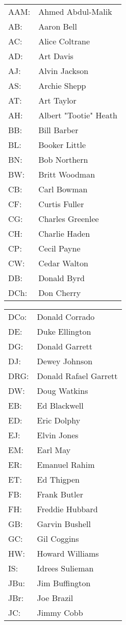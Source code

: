 \documentclass[a4paper,landscape]{article}
\begin{document}
{\tiny
\newcommand{\split}{\end{tabular}\begin{tabular}{l@{~}l}}
\begin{tabular}{l@{~}l}

AAM:&Ahmed Abdul-Malik\\
AB:&Aaron Bell\\
AC:&Alice Coltrane\\
AD:&Art Davis\\
AJ:&Alvin Jackson\\
AS:&Archie Shepp\\
AT:&Art Taylor\\
AH:&Albert "Tootie" Heath\\
BB:&Bill Barber\\
BL:&Booker Little\\
BN:&Bob Northern\\
BW:&Britt Woodman\\
CB:&Carl Bowman\\
CF:&Curtis Fuller\\
CG:&Charles Greenlee\\
CH:&Charlie Haden\\
CP:&Cecil Payne\\
CW:&Cedar Walton\\
DB:&Donald Byrd\\
DCh:&Don Cherry\\

\split

DCo:&Donald Corrado\\
DE:&Duke Ellington\\
DG:&Donald Garrett\\
DJ:&Dewey Johnson\\
DRG:&Donald Rafael Garrett\\
DW:&Doug Watkins\\
EB:&Ed Blackwell\\
ED:&Eric Dolphy\\
EJ:&Elvin Jones\\
EM:&Earl May\\
ER:&Emanuel Rahim\\
ET:&Ed Thigpen\\
FB:&Frank Butler\\
FH:&Freddie Hubbard\\
GB:&Garvin Bushell\\
GC:&Gil Coggins\\
HW:&Howard Williams\\
IS:&Idrees Sulieman\\
JBu:&Jim Buffington\\
JBr:&Joe Brazil\\
JC:&Jimmy Cobb\\


\end{tabular}}
\end{document}

